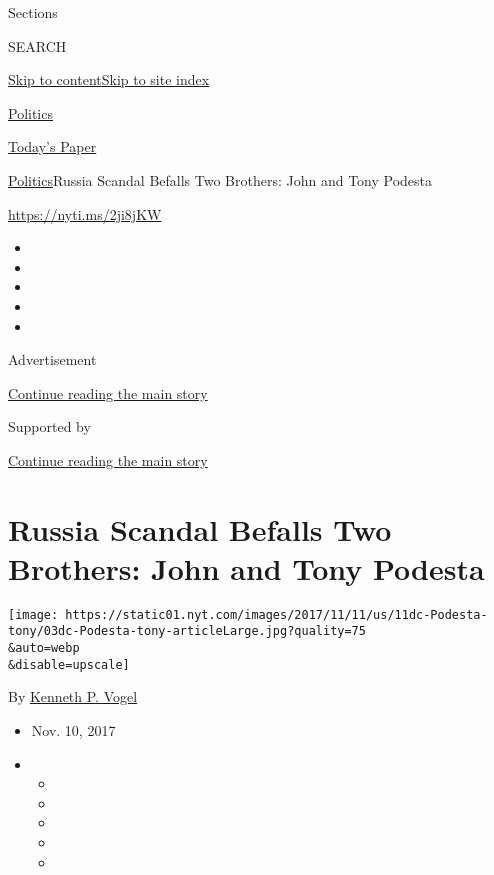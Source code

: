 Sections

SEARCH

\protect\hyperlink{site-content}{Skip to
content}\protect\hyperlink{site-index}{Skip to site index}

\href{https://www.nytimes.com/section/politics}{Politics}

\href{https://myaccount.nytimes.com/auth/login?response_type=cookie\&client_id=vi}{}

\href{https://www.nytimes.com/section/todayspaper}{Today's Paper}

\href{/section/politics}{Politics}\textbar{}Russia Scandal Befalls Two
Brothers: John and Tony Podesta

\url{https://nyti.ms/2ji8jKW}

\begin{itemize}
\item
\item
\item
\item
\item
\end{itemize}

Advertisement

\protect\hyperlink{after-top}{Continue reading the main story}

Supported by

\protect\hyperlink{after-sponsor}{Continue reading the main story}

\hypertarget{russia-scandal-befalls-two-brothers-john-and-tony-podesta}{%
\section{Russia Scandal Befalls Two Brothers: John and Tony
Podesta}\label{russia-scandal-befalls-two-brothers-john-and-tony-podesta}}

\texttt{[image: https://static01.nyt.com/images/2017/11/11/us/11dc-Podesta-tony/03dc-Podesta-tony-articleLarge.jpg?quality=75\\\&auto=webp\\\&disable=upscale]}

By \href{https://www.nytimes.com/by/kenneth-p-vogel}{Kenneth P. Vogel}

\begin{itemize}
\item
  Nov. 10, 2017
\item
  \begin{itemize}
  \item
  \item
  \item
  \item
  \item
  \end{itemize}
\end{itemize}

